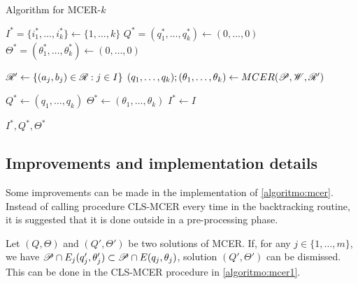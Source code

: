 \begin{algoritmo}
	\caption{Algorithm for MCER-$k$}\label{algoritmo:mcer-k}
	
	
	\begin{algorithmic}[1]
		
		\item[]
		
		\State $I^* = \{i_1^*, \dots, i_k^*\}\gets \{1, \dots, k\}$
		\State $Q^* = (q_1^*, \dots, q_k^*) \gets (0, \dots, 0)$
		\State $\Theta^* = (\theta_1^*, \dots, \theta_k^*) \gets (0, \dots, 0)$
		
		
		\State $\mathscr{R}' \gets \{(a_j, b_j) \in \mathscr{R}: j \in I\}$
		\State $(q_1, \dots, q_k); (\theta_1, \dots, \theta_k) \gets MCER(\mathscr{P}, \mathscr{W}, \mathscr{R}')$
		
		\State $Q^* \gets (q_1, \dots, q_k)$
		\State $\Theta^* \gets (\theta_1, \dots, \theta_k)$
		\State $I^* \gets I$
		\EndIf
		\EndFor
		
		\State \Return $I^*, Q^*, \Theta^*$
		\EndProcedure
	\end{algorithmic}
\end{algoritmo}


\subsection{Improvements and implementation details}

Some improvements can be made in the implementation of \autoref{algoritmo:mcer}.
Instead of calling procedure CLS-MCER every time in the backtracking routine, it is suggested that it is done outside in a pre-processing phase.

Let $(Q, \Theta)$ and $(Q', \Theta')$ be two solutions of MCER. If, for any $j \in \{1, \dots, m\}$, we have $\mathscr{P} \cap E_j(q_j', \theta_j') \subset \mathscr{P} \cap E(q_j, \theta_j)$, solution $(Q', \Theta')$ can be dismissed. This can be done in the CLS-MCER procedure in \autoref{algoritmo:mcer1}. 

